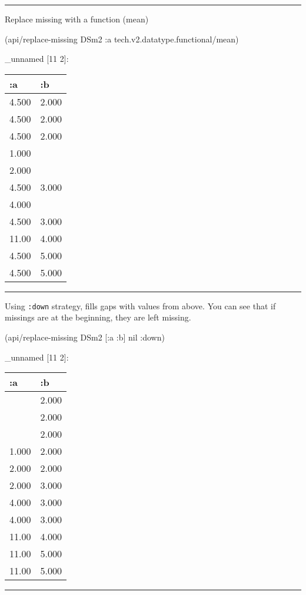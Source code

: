 \documentclass[]{article}
\newenvironment{Shaded}{\begin{snugshade}}{\end{snugshade}}
\newcommand{\VariableTok}[1]{\textcolor[rgb]{0.00,0.00,0.00}{#1}}
\newcommand{\AttributeTok}[1]{\textcolor[rgb]{0.77,0.63,0.00}{#1}}
\newcommand{\NormalTok}[1]{#1}
\begin{document}
\begin{center}\rule{0.5\linewidth}{0.5pt}\end{center}

Replace missing with a function (mean)

\begin{Shaded}
\begin{Highlighting}[]
\NormalTok{(api/replace-missing DSm2 }\AttributeTok{:a}\NormalTok{ tech.v2.datatype.functional/mean)}
\end{Highlighting}
\end{Shaded}

\_unnamed {[}11 2{]}:

\begin{longtable}[]{@{}ll@{}}
\toprule
:a & :b\tabularnewline
\midrule
\endhead
4.500 & 2.000\tabularnewline
4.500 & 2.000\tabularnewline
4.500 & 2.000\tabularnewline
1.000 &\tabularnewline
2.000 &\tabularnewline
4.500 & 3.000\tabularnewline
4.000 &\tabularnewline
4.500 & 3.000\tabularnewline
11.00 & 4.000\tabularnewline
4.500 & 5.000\tabularnewline
4.500 & 5.000\tabularnewline
\bottomrule
\end{longtable}

\begin{center}\rule{0.5\linewidth}{0.5pt}\end{center}

Using \texttt{:down} strategy, fills gaps with values from above. You
can see that if missings are at the beginning, they are left missing.

\begin{Shaded}
\begin{Highlighting}[]
\NormalTok{(api/replace-missing DSm2 [}\AttributeTok{:a} \AttributeTok{:b}\NormalTok{] }\VariableTok{nil} \AttributeTok{:down}\NormalTok{)}
\end{Highlighting}
\end{Shaded}

\_unnamed {[}11 2{]}:

\begin{longtable}[]{@{}ll@{}}
\toprule
:a & :b\tabularnewline
\midrule
\endhead
& 2.000\tabularnewline
& 2.000\tabularnewline
& 2.000\tabularnewline
1.000 & 2.000\tabularnewline
2.000 & 2.000\tabularnewline
2.000 & 3.000\tabularnewline
4.000 & 3.000\tabularnewline
4.000 & 3.000\tabularnewline
11.00 & 4.000\tabularnewline
11.00 & 5.000\tabularnewline
11.00 & 5.000\tabularnewline
\bottomrule
\end{longtable}

\begin{center}\rule{0.5\linewidth}{0.5pt}\end{center}
\end{document}
